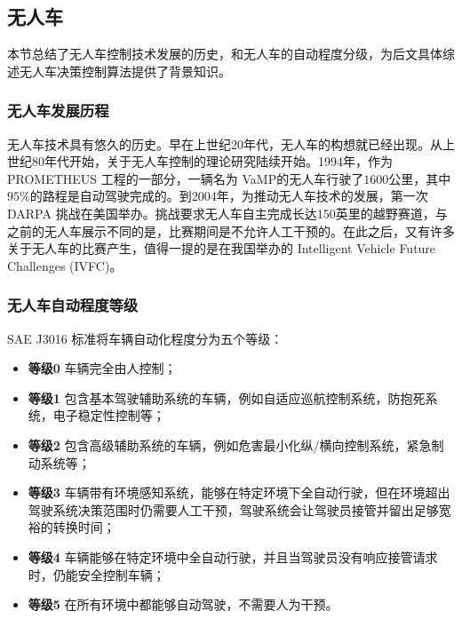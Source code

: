   \subsection{无人车}
  \label{sec:self}

    本节总结了无人车控制技术发展的历史，和无人车的自动程度分级，为后文具体综述无人车决策控制算法提供了背景知识。

    \subsubsection{无人车发展历程}
    无人车技术具有悠久的历史。早在上世纪20年代，无人车的构想就已经出现\cite{Adrienne2016Your}。从上世纪80年代开始，关于无人车控制的理论研究陆续开始\cite{Dickmanns1988Dynamic}。1994年，作为 PROMETHEUS 工程\cite{eureka2016}的一部分，一辆名为 VaMP的无人车\cite{vamp2017}行驶了$1600$公里，其中$95\%$的路程是自动驾驶完成的。到2004年，为推动无人车技术的发展，第一次 DARPA 挑战在美国举办。挑战要求无人车自主完成长达150英里的越野赛道，与之前的无人车展示不同的是，比赛期间是不允许人工干预的。在此之后，又有许多关于无人车的比赛产生，值得一提的是在我国举办的 Intelligent Vehicle Future Challenges (IVFC)\cite{Xin2014China}。

    \subsubsection{无人车自动程度等级}
    SAE J3016 标准\cite{SO2014Taxonomy}将车辆自动化程度分为五个等级：

    \begin{itemize}
    \item \textbf{等级0} 车辆完全由人控制；
    \item \textbf{等级1} 包含基本驾驶辅助系统的车辆，例如自适应巡航控制系统，防抱死系统，电子稳定性控制\cite{Rajamani2011Vehicle}等；
    \item \textbf{等级2} 包含高级辅助系统的车辆，例如危害最小化纵/横向控制系统\cite{Gerdes2001A}，紧急制动系统\cite{Brannstrom2010Model,Vahidi2003Research}等；
    \item \textbf{等级3} 车辆带有环境感知系统，能够在特定环境下全自动行驶，但在环境超出驾驶系统决策范围时仍需要人工干预，驾驶系统会让驾驶员接管并留出足够宽裕的转换时间；
    \item \textbf{等级4} 车辆能够在特定环境中全自动行驶，并且当驾驶员没有响应接管请求时，仍能安全控制车辆；
    \item \textbf{等级5} 在所有环境中都能够自动驾驶，不需要人为干预。
    \end{itemize}

